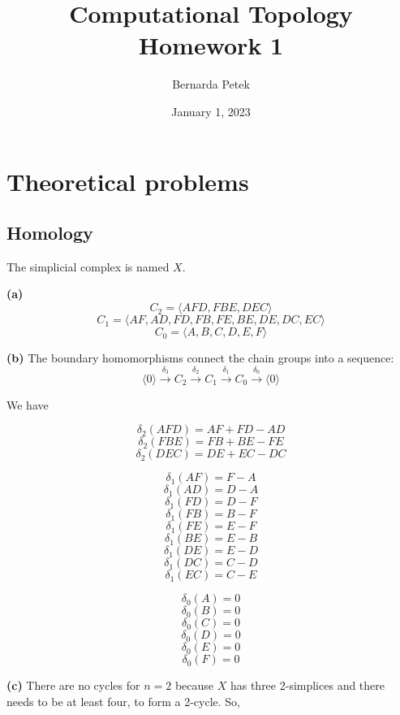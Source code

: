 \documentclass[12pt]{article}
\begin{document}
	
	
	
	
	\title{Computational Topology \\ Homework 1}
	\author{%
		Bernarda Petek} %
	
	\date{January 1, 2023}
	\maketitle
	
	
	
	\section{Theoretical problems}
	\subsection{Homology}
	
	The simplicial complex is named $X$.
	 
	\textbf{(a)}
	$$C_2 = \langle AFD, FBE, DEC \rangle $$
	$$C_1 = \langle AF, AD, FD, FB, FE, BE, DE, DC, EC \rangle $$
	$$C_0 = \langle A, B, C, D, E, F \rangle $$	
	
	\textbf{(b)}
	The boundary homomorphisms connect the chain groups into a sequence: 
	$$\langle 0 \rangle \xrightarrow{\text{$\delta_3$}} C_2 \xrightarrow{\text{$\delta_2$}} C_1 \xrightarrow{\text{$\delta_1$}} C_0  \xrightarrow{\text{$\delta_0$}} \langle 0 \rangle$$
	
	We have 
	
	$$\delta_2(AFD) = AF + FD - AD$$
	$$\delta_2(FBE) = FB + BE - FE$$
	$$\delta_2(DEC) = DE + EC - DC$$
	
	$$\delta_1(AF) = F-A$$
	$$\delta_1(AD) = D-A$$
	$$\delta_1(FD) = D-F$$
	$$\delta_1(FB) = B-F$$
	$$\delta_1(FE) = E-F$$
	$$\delta_1(BE) = E-B$$
	$$\delta_1(DE) = E-D$$
	$$\delta_1(DC) = C-D$$
	$$\delta_1(EC) = C-E$$
	
	$$\delta_0(A) = 0$$
	$$\delta_0(B) = 0$$
	$$\delta_0(C) = 0$$
	$$\delta_0(D) = 0$$
	$$\delta_0(E) = 0$$
	$$\delta_0(F) = 0$$
	
	\textbf{(c)}
		There are no cycles for $n=2$ because $X$ has three 2-simplices and there needs to be at least four, to form a 2-cycle. So,
	
\end{document}
